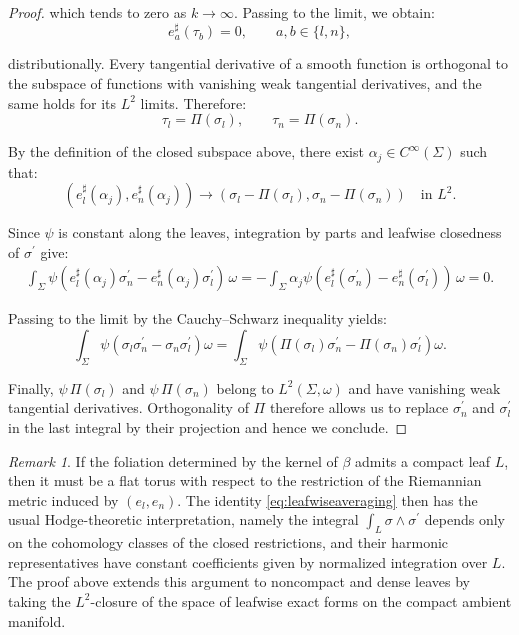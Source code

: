 \documentclass[10pt,reqno,a4paper]{amsart}
\theoremstyle{plain}
\theoremstyle{definition}
\theoremstyle{remark}
\newtheorem{remark}[thm]{Remark}
\theoremstyle{remark}
\renewcommand{\(}{ (}
\renewcommand{\)}{ )}
\begin{document}
\begin{proof}
\noindent
which tends to zero as $k\to\infty$. Passing to the limit, we obtain: 
\begin{equation*}
e_a^{\sharp}(\tau_b)=0,
\qquad a,b\in\{l,n\},
\end{equation*}

\noindent
distributionally. Every tangential derivative of a smooth function is orthogonal to the subspace of functions with vanishing weak tangential derivatives, and the same holds for its $L^2$ limits. Therefore:
\begin{equation*}
\tau_l=\Pi(\sigma_l),
\qquad
\tau_n=\Pi(\sigma_n).
\end{equation*}

\noindent
By the definition of the closed subspace above, there exist $\alpha_j\in C^{\infty}(\Sigma)$ such that:
\begin{equation*}
 (e_l^{\sharp}(\alpha_j),e_n^{\sharp}(\alpha_j) )
\longrightarrow
 (\sigma_l-\Pi(\sigma_l),\sigma_n-\Pi(\sigma_n) )
\quad\text{in }L^2.
\end{equation*}

\noindent
Since $\psi$ is constant along the leaves, integration by parts and leafwise closedness of $\sigma^{\prime}$ give:
\begin{eqnarray*}
\int_{\Sigma}\psi ( e_l^{\sharp}(\alpha_j)\sigma_n^{\prime}
-e_n^{\sharp}(\alpha_j)\sigma_l^{\prime})\,\omega = -\int_{\Sigma}\alpha_j\psi ( e_l^{\sharp}(\sigma_n^{\prime}) - e_n^{\sharp}(\sigma_l^{\prime}))\,\omega=0.
\end{eqnarray*}

\noindent
Passing to the limit by the Cauchy--Schwarz inequality yields:
\begin{equation*}
\int_{\Sigma}\psi (\sigma_l\sigma_n^{\prime}-\sigma_n\sigma_l^{\prime} )\omega
=\int_{\Sigma}\psi (\Pi(\sigma_l)\sigma_n^{\prime}-\Pi(\sigma_n)\sigma_l^{\prime} )\omega.
\end{equation*}

\noindent
Finally, $\psi\,\Pi(\sigma_l)$ and $\psi\,\Pi(\sigma_n)$ belong to $L^2(\Sigma,\omega)$ and have vanishing weak tangential derivatives. Orthogonality of $\Pi$ therefore allows us to replace $\sigma_n^{\prime}$ and $\sigma_l^{\prime}$ in the last integral by their projection and hence we conclude.
\end{proof}

\begin{remark}
If the foliation determined by the kernel of $\beta$ admits a compact leaf $L$, then it must be a flat torus with respect to the restriction of the Riemannian metric induced by $(e_l,e_n)$. The identity \eqref{eq:leafwiseaveraging} then has the usual Hodge-theoretic interpretation, namely the integral $\int_L \sigma \wedge \sigma^{\prime}$ depends only on the cohomology classes of the closed restrictions, and their harmonic representatives have constant coefficients given by normalized integration over $L$. The proof above extends this argument to noncompact and dense leaves by taking the $L^2$-closure of the space of leafwise exact forms on the compact ambient manifold. 
\end{remark}
\end{document}
